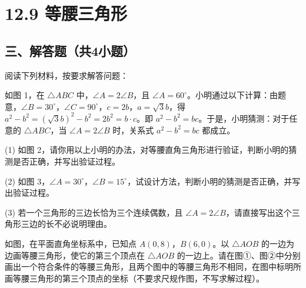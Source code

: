 \chapter{12.9 等腰三角形}



\section*{三、解答题（共4小题）}

\solutionlist[14]


\item 阅读下列材料，按要求解答问题：

如图 1，在 $\triangle ABC$ 中，$\angle A = 2\angle B$，且 $\angle A = 60^\circ$。小明通过以下计算：由题意，$\angle B = 30^\circ$，$\angle C = 90^\circ$，$c = 2b$，$a = \sqrt{3}b$，得 $a^2 - b^2 = (\sqrt{3}b)^2 - b^2 = 2b^2 = b \cdot c$。即 $a^2 - b^2 = bc$。于是，小明猜测：对于任意的 $\triangle ABC$，当 $\angle A = 2\angle B$ 时，关系式 $a^2 - b^2 = bc$ 都成立。

(1) 如图 2，请你用以上小明的办法，对等腰直角三角形进行验证，判断小明的猜测是否正确，并写出验证过程。


\vspace{3cm}

(2) 如图 3，$\angle A = 30^\circ$，$\angle B = 15^\circ$，试设计方法，判断小明的猜测是否正确，并写出验证过程。


\vspace{3cm}

(3) 若一个三角形的三边长恰为三个连续偶数，且 $\angle A = 2\angle B$，请直接写出这个三角形三边的长不必说明理由。

\vspace{3cm}



\item 如图，在平面直角坐标系中，已知点 $A(0, 8)$，$B(6, 0)$。以 $\triangle AOB$ 的一边为边画等腰三角形，使它的第三个顶点在 $\triangle AOB$ 的一边上。请在图①、图②中分别画出一个符合条件的等腰三角形，且两个图中的等腰三角形不相同，在图中标明所画等腰三角形的第三个顶点的坐标（不要求尺规作图，不写求解过程）。



\vspace{6cm}



